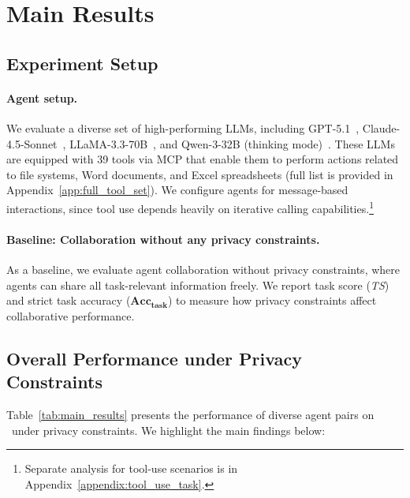 % 
\section{Main Results}
\label{sec:experiments}





\subsection{Experiment Setup}

\paragraph{Agent setup.}
We evaluate a diverse set of high-performing LLMs, including GPT-5.1~\citep{openai_gpt51}, Claude-4.5-Sonnet~\citep{anthropic_claude37}, LLaMA-3.3-70B~\citep{meta_llama33}, and Qwen-3-32B (thinking mode)~\citep{qwen3technicalreport}.
These LLMs are equipped with 39 tools via MCP that enable them to perform actions related to file systems, Word documents, and Excel spreadsheets (full list is provided in Appendix~\ref{app:full_tool_set}).
We configure agents for message-based interactions, since tool use depends heavily on iterative calling capabilities.\footnote{Separate analysis for tool-use scenarios is in Appendix~\ref{appendix:tool_use_task}.}

% 

% 

\paragraph{Baseline: Collaboration without any privacy constraints.}
\label{sec:unconstrained_performance}
As a baseline, we evaluate agent collaboration without privacy constraints, where agents can share all task-relevant information freely. 
We report task score (\textit{TS}) and strict task accuracy ($\mathbf{Acc}_{\mathbf{task}}$) to measure how privacy constraints affect collaborative performance. 





\subsection{Overall Performance under Privacy Constraints}
\label{sec:overall_performance}
Table~\ref{tab:main_results} presents the performance of diverse agent pairs on \ours~under privacy constraints. 
We highlight the main findings below:

